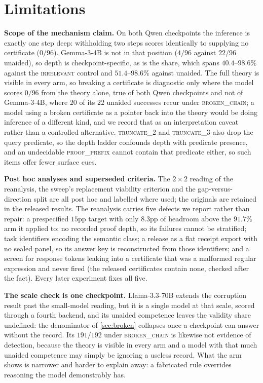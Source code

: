 \documentclass[10pt,twocolumn]{article}
\begin{document}
\section{Limitations}

\textbf{Scope of the mechanism claim.} On both Qwen checkpoints the inference is
exactly one step deep: withholding two steps scores identically to supplying no
certificate ($0/96$). Gemma-3-4B is not in that position ($4/96$ against $22/96$
unaided), so depth is checkpoint-specific, as is the share, which spans
$40.4$--$98.6\%$ against the \textsc{irrelevant} control and $51.4$--$98.6\%$
against unaided. The full theory is visible in every arm, so breaking a
certificate is diagnostic only where the model scores $0/96$ from the theory
alone, true of both Qwen checkpoints and not of Gemma-3-4B, where $20$ of its
$22$ unaided successes recur under \textsc{broken\_chain}; a model using a broken
certificate as a pointer back into the theory would be doing inference of a
different kind, and we record that as an interpretation caveat rather than a
controlled alternative. \textsc{truncate\_2} and \textsc{truncate\_3} also drop
the query predicate, so the depth ladder confounds depth with predicate
presence, and an undecidable \textsc{proof\_prefix} cannot contain that
predicate either, so such items offer fewer surface cues.

\textbf{Post hoc analyses and superseded criteria.} The $2\times2$ reading of
the reanalysis, the sweep's replacement viability criterion and the
gap-versus-direction split are all post hoc and labelled where used; the
originals are retained in the released results. The reanalysis carries five
defects we report rather than repair: a prespecified $15$pp target with only
$8.3$pp of headroom above the $91.7\%$ arm it applied to; no recorded proof
depth, so its failures cannot be stratified; task identifiers encoding the
semantic class; a release as a flat receipt export with no sealed panel, so its
answer key is reconstructed from those identifiers; and a screen for response
tokens leaking into a certificate that was a malformed regular expression and
never fired (the released certificates contain none, checked after the fact).
Every later experiment fixes all five.

\textbf{The scale check is one checkpoint.} Llama-3.3-70B extends the
corruption result past the small-model reading, but it is a single model at that
scale, scored through a fourth backend, and its unaided competence leaves the
validity share undefined: the denominator of \cref{sec:broken} collapses once a
checkpoint can answer without the record. Its $191/192$ under
\textsc{broken\_chain} is likewise not evidence of detection, because the theory
is visible in every arm and a model with that much unaided competence may simply
be ignoring a useless record. What the arm shows is narrower and harder to
explain away: a fabricated rule overrides reasoning the model demonstrably has.
\end{document}
